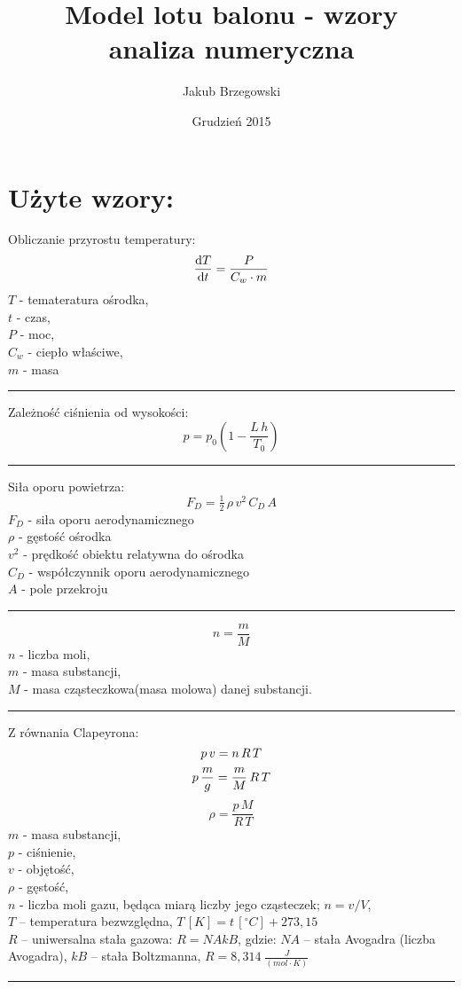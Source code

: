 \documentclass[a4paper,11pt]{article}
\title{Model lotu balonu - wzory\\ analiza numeryczna}
\author{Jakub Brzegowski}
\date{Grudzień 2015}
\begin{document}
\maketitle

\section{Użyte wzory:}

Obliczanie przyrostu temperatury:
\[
    \dv{T}{t} = \frac{P}{C_w \cdot m}
\]
$T$ - temateratura ośrodka, \\
$t$ - czas, \\
$P$ - moc, \\
$C_w$ - ciepło właściwe, \\
$m$ - masa

\noindent \rule{16cm}{2pt}

Zależność ciśnienia od wysokości:
\[
    p = p_0 \left( 1 - \frac{L\, h}{T_0} \right)
\]

\noindent \rule{16cm}{2pt}

Siła oporu powietrza:
\[
    F_D = \tfrac{1}{2}\, \rho\, v^2\, C_D\, A
\]
$F_D$ - siła oporu aerodynamicznego \\
$\rho$ - gęstość ośrodka \\
$v^2$ - prędkość obiektu relatywna do ośrodka \\
$C_D$ - współczynnik oporu aerodynamicznego \\
$A$ - pole przekroju \\

\noindent \rule{16cm}{2pt}

\[
    n = \frac{m}{M}
\]
$n$ - liczba moli, \\
$m$ - masa substancji, \\
$M$ - masa cząsteczkowa(masa molowa) danej substancji.

\noindent \rule{16cm}{2pt}

Z równania Clapeyrona:
\[
    p\, v = n\, R\, T \\
\]
\[
    p\, \frac{m}{g} = \frac{m}{M}\, R\, T \\
\]
\[
    \rho = \frac{p\, M}{R\, T}
\]
$m$ - masa substancji, \\
$p$ - ciśnienie, \\
$v$ - objętość, \\
$\rho$ - gęstość, \\
$n$ - liczba moli gazu, będąca miarą liczby jego cząsteczek; $n = v/V$, \\
$T$ – temperatura bezwzględna, $T\, [K]  = t\, [^{\circ}C] + 273,15$ \\
$R$ – uniwersalna stała gazowa: $R = NAkB$, gdzie: $NA$ – stała Avogadra (liczba Avogadra), $kB$ – stała Boltzmanna, $R = 8,314\; \frac{J}{(mol \cdot K)}$

\noindent \rule{16cm}{2pt}
\end{document}
